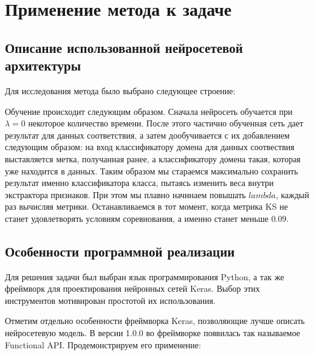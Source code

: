 \documentclass[14pt]{extarticle}
\begin{document}
\newpage
\section{Применение метода к задаче}

\subsection{Описание использованной нейросетевой архитектуры}

Для исследования метода было выбрано следующее строение: %


Обучение происходит следующим образом.
Сначала нейросеть обучается при $\lambda = 0$ некоторое количество времени. После этого частично обученная сеть дает результат для данных соответствия, а затем дообучивается с их добавлением следующим образом: на вход классификатору домена для данных соотвествия выставляется метка, получанная ранее, а классификатору домена такая, которая уже находится в данных. Таким образом мы стараемся максимально сохранить результат именно классификатора класса, пытаясь изменить веса внутри экстрактора признаков. При этом мы плавно начинаем повышать $lambda$, каждый раз вычисляя метрики. Останавливаемся в тот момент, когда метрика KS не станет удовлетворять условиям соревнования, а именно станет меньше $0.09$. 

\subsection{Особенности программной реализации}
Для решения задачи был выбран язык программирования Python, а так же фреймворк для проектирования нейронных сетей Keras. Выбор этих инструментов мотивирован простотой их использования.

Отметим отдельно особенности фреймворка Keras, позволяющие лучше описать нейросетевую модель. В версии 1.0.0 во фреймворке появилась так называемое Functional API. Продемонстрируем его применение:
\end{document}
